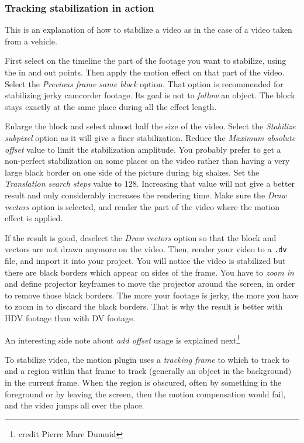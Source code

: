\subsubsection*{Tracking stabilization in action}
\label{ssub:tracking_stabilization_action}

This is an explanation of how to stabilize a video as in the case of a video taken from a vehicle.

First select on the timeline the part of the footage you want to stabilize, using the in and out points. Then apply the motion effect on that part of the video. Select the \textit{Previous frame same block} option. That option is recommended for stabilizing jerky camcorder footage. Its goal is not to \textit{follow} an object. The block stays exactly at the same place during all the effect length.

Enlarge the block and select almost half the size of the video. Select the \textit{Stabilize subpixel} option as it will give a finer stabilization. Reduce the \textit{Maximum absolute offset} value to limit the stabilization amplitude. You probably prefer to get a non-perfect stabilization on some places on the video rather than having a very large black border on one side of the picture during big shakes. Set the \textit{Translation search steps} value to $128$. Increasing that value will not give a better result and only considerably increases the rendering time. Make sure the \textit{Draw vectors} option is selected, and render the part of the video where the motion effect is applied.

If the result is good, deselect the \textit{Draw vectors} option so that the block and vectors are not drawn anymore on the video. Then, render your video to a \texttt{.dv} file, and import it into your project. You will notice the video is stabilized but there are black borders which appear on sides of the frame. You have to \textit{zoom in} and define projector keyframes to move the projector around the screen, in order to remove those black borders. The more your footage is jerky, the more you have to zoom in to discard the black borders. That is why the result is better with HDV footage than with DV footage.

An interesting side note about \textit{add offset} usage is explained next\protect\footnote{credit Pierre Marc Dumuid}

To stabilize video, the motion plugin uses a \textit{tracking frame} to which to track to and a region within that frame to track (generally an object in the background) in the current frame.  When the region is obscured, often by something in the foreground or by leaving the screen, then the motion compensation would fail, and the video jumps all over the place.


